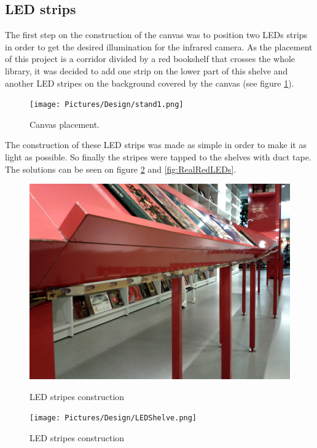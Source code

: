 \subsection{LED strips}
The first step on the construction of the canvas was to position two LEDs strips in order to get the desired illumination for the infrared camera. As the placement of this project is a corridor divided by a red bookshelf that crosses the whole library, it was decided to add one strip on the lower part of this shelve and another LED stripes on the background covered by the canvas (see figure \ref{fig:LEDsPosition}).

\begin{figure}[htbp] 
\centering 
\texttt{[image: Pictures/Design/stand1.png]} 
\caption{Canvas placement.}
\label{fig:LEDsPosition} 
\end{figure}

The construction of these LED strips was made as simple in order to make it as light as possible. So finally the stripes were tapped to the shelves with duct tape. The solutions can be seen on figure \ref{fig:RealLEDs} and \ref{fig:RealRedLEDs}.

\begin{figure}[htbp] \centering
\begin{minipage}[b]{0.45\textwidth} \centering
\includegraphics[width=1.00\textwidth]{Pictures/Design/LEDRedShelve.png}
\caption{LED stripes construction}
\label{fig:RealRedLEDs}
\end{minipage} \hfill
\begin{minipage}[b]{0.45\textwidth} \centering
\texttt{[image: Pictures/Design/LEDShelve.png]} 
\caption{LED stripes construction}
\label{fig:RealLEDs}
\end{minipage} \hfill
\end{figure}

